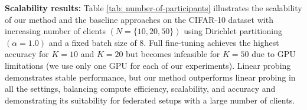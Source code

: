 \noindent\textbf{Scalability results:} Table \ref{tab: number-of-participants} illustrates the scalability of our method and the baseline approaches on the CIFAR-10 dataset with increasing number of clients $(N=\{10, 20, 50\})$ using Dirichlet partitioning $(\alpha=1.0)$ and a fixed batch size of 8. Full fine-tuning achieves the highest accuracy for $K = 10$ and $K = 20$ but becomes infeasible for $K = 50$ due to GPU limitations (we use only one GPU for each of our experiments). Linear probing demonstrates stable performance, but our method outperforms linear probing in all the settings, balancing compute efficiency, scalability, and accuracy and demonstrating its suitability for federated setups with a large number of clients. 



